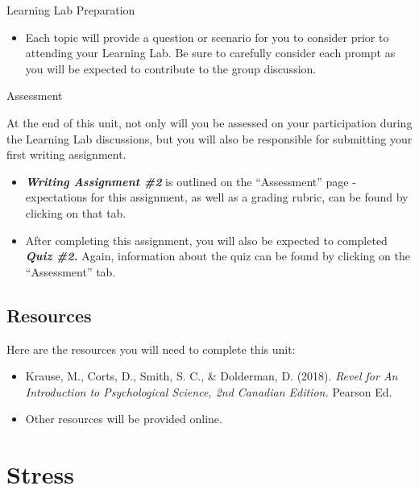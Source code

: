 \documentclass[
]{book}
\providecommand{\tightlist}{%
  \setlength{\itemsep}{0pt}\setlength{\parskip}{0pt}}
\begin{document}
\begin{reflect}
{Learning Lab Preparation}

\begin{itemize}
\tightlist
\item
  Each topic will provide a question or scenario for you to consider prior to attending your Learning Lab. Be sure to carefully consider each prompt as you will be expected to contribute to the group discussion.
\end{itemize}

{Assessment}

At the end of this unit, not only will you be assessed on your participation during the Learning Lab discussions, but you will also be responsible for submitting your first writing assignment.

\begin{itemize}
\item
  \textbf{\emph{Writing Assignment \#2}} is outlined on the ``Assessment'' page - expectations for this assignment, as well as a grading rubric, can be found by clicking on that tab.
\item
  After completing this assignment, you will also be expected to completed \textbf{\emph{Quiz \#2.}} Again, information about the quiz can be found by clicking on the ``Assessment'' tab.
\end{itemize}
\end{reflect}

\hypertarget{resources-10}{%
\subsection*{Resources}\label{resources-10}}

Here are the resources you will need to complete this unit:

\begin{itemize}
\tightlist
\item
  Krause, M., Corts, D., Smith, S. C., \& Dolderman, D. (2018). \emph{Revel for An Introduction to Psychological Science, 2nd Canadian Edition.} Pearson Ed.\\
\item
  Other resources will be provided online.
\end{itemize}

\hypertarget{stress}{%
\section{Stress}\label{stress}}
\end{document}
